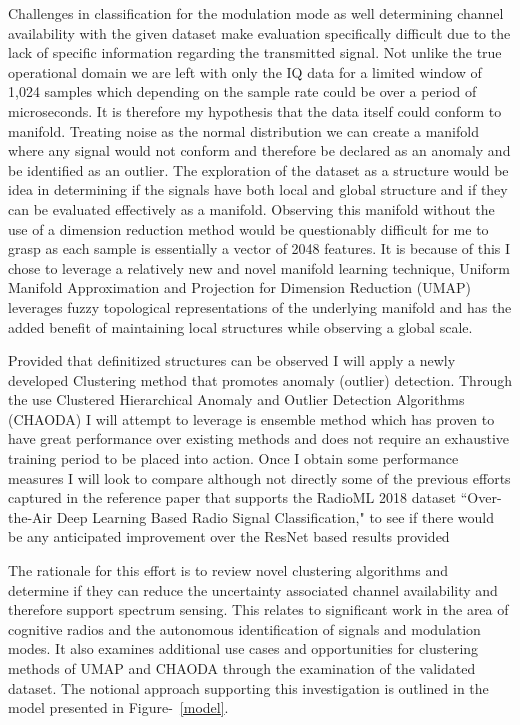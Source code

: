\documentclass[conference]{IEEEtran}
\begin{document}
Challenges in classification for the modulation mode as well determining channel availability with the given dataset make evaluation specifically difficult due to the lack of specific information regarding the transmitted signal. Not unlike the true operational domain we are left with only the IQ data for a limited window of 1,024 samples which depending on the sample rate could be over a period of microseconds. It is therefore my hypothesis that the data itself could conform to manifold. Treating noise as the normal distribution we can create a manifold where any signal would not conform and therefore be declared as an anomaly and be identified as an outlier. The exploration of the dataset as a structure would be idea in determining if the signals have both local and global structure and if they can be evaluated effectively as a manifold. Observing this manifold without the use of a dimension reduction method would be questionably difficult for me to grasp as each sample is essentially a vector of 2048 features. It is because of this I chose to leverage a relatively new and novel manifold learning technique, Uniform Manifold Approximation and Projection for Dimension Reduction (UMAP) leverages fuzzy topological representations of the underlying manifold and has the added benefit of maintaining local structures while observing a global scale. 

Provided that definitized structures can be observed I will apply a newly developed Clustering method that promotes anomaly (outlier) detection.  Through the use Clustered Hierarchical Anomaly and Outlier Detection Algorithms (CHAODA) I will attempt to leverage is ensemble method which has proven to have great performance over existing methods and does not require an exhaustive training period to be placed into action. Once I obtain some performance measures I will look to compare although not directly some of the previous efforts captured in the reference paper that supports the RadioML 2018 dataset “Over-the-Air Deep Learning Based Radio Signal Classification," \cite{b7} to see if there would be any anticipated improvement over the ResNet based results provided

The rationale for this effort is to review novel clustering algorithms and determine if they can reduce the uncertainty associated channel availability and therefore support spectrum sensing. This relates to significant work in the area of cognitive radios and the autonomous identification of signals and modulation modes. It also examines additional use cases and opportunities for clustering methods of UMAP and CHAODA through the examination of the validated dataset.  The notional approach supporting this investigation is outlined in the model presented in Figure-~\ref{model}. 
\end{document}
